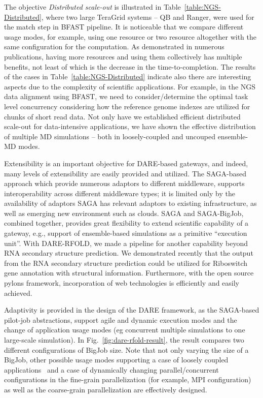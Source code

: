 \documentclass{sig-alternate}
\begin{document}
The objective {\it Distributed scale-out} is illustrated in
Table~\ref{table:NGS-Distributed}, where two large TeraGrid systems --
QB and Ranger, were used for the match step in BFAST pipeline.  It is
noticeable that we compare different usage modes, for example, using
one resource or two resource altogether with the same configuration
for the computation.  As demonstrated in numerous publications, having
more resources and using them collectively has multiple benefits, not
least of which is the decrease in the time-to-completion.  The results
of the cases in Table~\ref{table:NGS-Distributed} indicate also there
are interesting aspects due to the complexity of scientific
applications.  For example, in the NGS data alignment using BFAST, we
need to consider/determine the optimal task level concurrency
considering how the reference genome indexes are utilized for chunks
of short read data\cite{ecmls11}. Not only have we established
efficient distributed scale-out for data-intensive applications, we
have shown the effective distribution of multiple MD simulations --
both in loosely-coupled and uncouped ensemble-MD modes.

Extensibility is an important objective for DARE-based gateways, and
indeed, many levels of extensibility are easily provided and utilized.
The SAGA-based approach which provide numerous adaptors to different
middleware, supports interoperability across different middleware
types; it is limited only by the availability of adaptors SAGA has
relevant adaptors to existing infrastructure, as well as emerging new
environment such as clouds. SAGA and SAGA-BigJob, combined together,
provides great flexibility to extend scientific capability of a
gateway, e.g., support of ensemble-based simulations as a primitive
``execution unit''. With DARE-RFOLD, we made a pipeline for another
capability beyond RNA secondary structure prediction.  We demonstrated
recently that the output from the RNA secondary structure prediction
could be utilized for Riboswitch gene annotation with structural
information.  Furthermore, with the open source pylons framework,
incorporation of web technologies is efficiently and easily achieved.

Adaptivity is provided in the design of the DARE framework, as the
SAGA-based pilot-job abstractions, support agile and dynamic execution
modes and the change of application usage modes (eg concurrent
multiple simulations to one large-scale simulation). In
Fig.~\ref{fig:dare-rfold-result}, the result compares two different
configurations of BigJob size.  Note that not only varying the size of
a BigJob, other possible usage modes supporting a case of loosely
coupled applications~\cite{coupled} and a case of dynamically changing
parallel/concurrent configurations in the fine-grain parallelization
(for example, MPI configuration) as well as the coarse-grain
parallelization are effectively designed.
\end{document}
